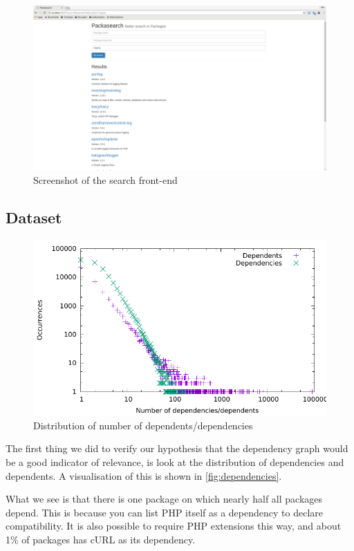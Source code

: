 \documentclass{article}
\begin{document}
\begin{figure}
	\centering
	\includegraphics[width=\textwidth]{screenshot}
	\caption{Screenshot of the search front-end}
	\label{fig:screenshot}
\end{figure}

\subsection{Dataset}

\begin{figure}
	\centering
	\includegraphics[width=\textwidth]{dependencies}
	\caption{Distribution of number of dependents/dependencies}
	\label{fig:dependencies}
\end{figure}

The first thing we did to verify our hypothesis that the dependency graph would be a good indicator of relevance, is look at the distribution of dependencies and dependents. A visualisation of this is shown in \autoref{fig:dependencies}.

What we see is that there is one package on which nearly half all packages depend. This is because you can list PHP itself as a dependency to declare compatibility. It is also possible to require PHP extensions this way, and about 1\% of packages has cURL as its dependency.
\end{document}
